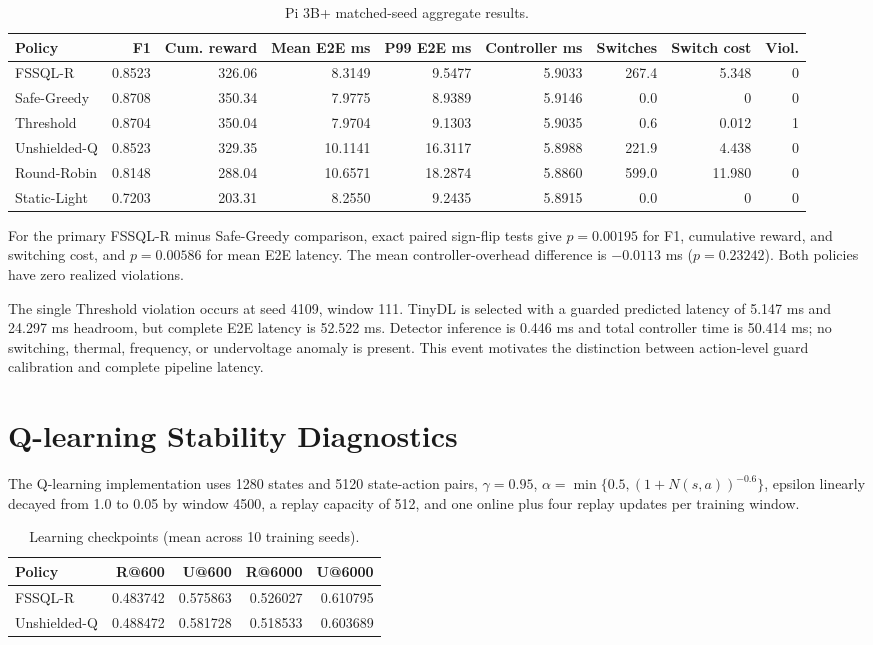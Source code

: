 \documentclass[10pt,journal]{IEEEtran}
\begin{document}
\begin{table}[h]
\caption{Pi 3B+ matched-seed aggregate results.}
\centering\footnotesize
\begin{tabular}{lrrrrrrrr}
\toprule
Policy & F1 & Cum. reward & Mean E2E ms & P99 E2E ms & Controller ms & Switches & Switch cost & Viol. \\
\midrule
FSSQL-R & 0.8523 & 326.06 & 8.3149 & 9.5477 & 5.9033 & 267.4 & 5.348 & 0 \\
Safe-Greedy & 0.8708 & 350.34 & 7.9775 & 8.9389 & 5.9146 & 0.0 & 0 & 0 \\
Threshold & 0.8704 & 350.04 & 7.9704 & 9.1303 & 5.9035 & 0.6 & 0.012 & 1 \\
Unshielded-Q & 0.8523 & 329.35 & 10.1141 & 16.3117 & 5.8988 & 221.9 & 4.438 & 0 \\
Round-Robin & 0.8148 & 288.04 & 10.6571 & 18.2874 & 5.8860 & 599.0 & 11.980 & 0 \\
Static-Light & 0.7203 & 203.31 & 8.2550 & 9.2435 & 5.8915 & 0.0 & 0 & 0 \\
\bottomrule
\end{tabular}
\end{table}

For the primary FSSQL-R minus Safe-Greedy comparison, exact paired sign-flip tests give $p=0.00195$ for F1, cumulative reward, and switching cost, and $p=0.00586$ for mean E2E latency. The mean controller-overhead difference is $-0.0113$ ms ($p=0.23242$). Both policies have zero realized violations.

The single Threshold violation occurs at seed 4109, window 111. TinyDL is selected with a guarded predicted latency of 5.147 ms and 24.297 ms headroom, but complete E2E latency is 52.522 ms. Detector inference is 0.446 ms and total controller time is 50.414 ms; no switching, thermal, frequency, or undervoltage anomaly is present. This event motivates the distinction between action-level guard calibration and complete pipeline latency.

\section{Q-learning Stability Diagnostics}
The Q-learning implementation uses 1280 states and 5120 state-action pairs, $\gamma=0.95$, $\alpha=\min\{0.5,(1+N(s,a))^{-0.6}\}$, epsilon linearly decayed from 1.0 to 0.05 by window 4500, a replay capacity of 512, and one online plus four replay updates per training window.

\begin{table}[h]
\caption{Learning checkpoints (mean across 10 training seeds).}
\centering\scriptsize
\setlength{\tabcolsep}{3pt}
\begin{tabular}{lrrrr}
\toprule
Policy & R@600 & U@600 & R@6000 & U@6000 \\
\midrule
FSSQL-R & 0.483742 & 0.575863 & 0.526027 & 0.610795 \\
Unshielded-Q & 0.488472 & 0.581728 & 0.518533 & 0.603689 \\
\bottomrule
\end{tabular}
\end{table}
\end{document}
